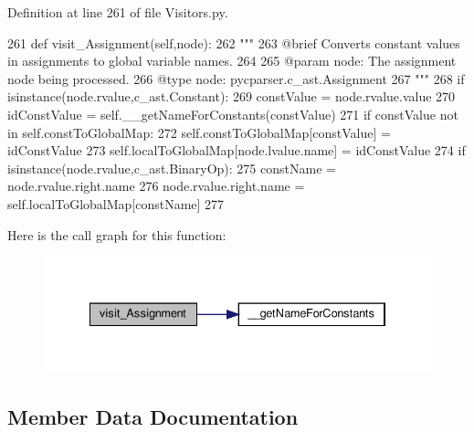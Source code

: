 Definition at line 261 of file Visitors.\+py.


\begin{DoxyCode}
261     \textcolor{keyword}{def }visit\_Assignment(self,node):
262         \textcolor{stringliteral}{"""
}
263 \textcolor{stringliteral}{        @brief Converts constant values in assignments to global variable names.
}
264 \textcolor{stringliteral}{
}
265 \textcolor{stringliteral}{        @param node: The assignment node being processed.
}
266 \textcolor{stringliteral}{        @type node: pycparser.c\_ast.Assignment
}
267 \textcolor{stringliteral}{        """}
268         \textcolor{keywordflow}{if} isinstance(node.rvalue,c\_ast.Constant):
269             constValue = node.rvalue.value
270             idConstValue = self.\_\_getNameForConstants(constValue)
271             \textcolor{keywordflow}{if} constValue \textcolor{keywordflow}{not} \textcolor{keywordflow}{in} self.constToGlobalMap:
272                 self.constToGlobalMap[constValue] = idConstValue
273             self.localToGlobalMap[node.lvalue.name] = idConstValue
274         \textcolor{keywordflow}{if} isinstance(node.rvalue,c\_ast.BinaryOp):
275             constName = node.rvalue.right.name
276             node.rvalue.right.name = self.localToGlobalMap[constName]
277 
\end{DoxyCode}
Here is the call graph for this function\+:\nopagebreak
\begin{figure}[H]
\begin{center}
\leavevmode
\includegraphics[width=334pt]{classVisitors_1_1ConstantMerger_adae6ad6f5b94c4acd95924bb3df9ebc8_cgraph}
\end{center}
\end{figure}


\subsection{Member Data Documentation}
\mbox{\label{classVisitors_1_1ConstantMerger_a09a8838a26160063ff7f70a6d8ca53f8}} 
